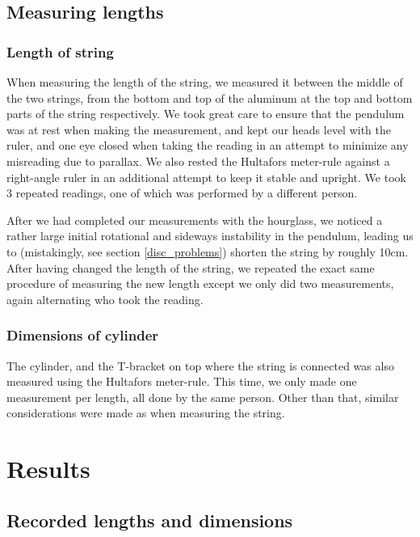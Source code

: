 \documentclass[%
 reprint,
 amsmath,amssymb,
 aps,
]{revtex4-1}
\begin{document}
        \subsection{Measuring lengths}
            \subsubsection{\label{subsubsect:strings}Length of string}
                When measuring the length of the string, we measured it between the middle of the two strings, from the bottom and top of the aluminum at the top and bottom parts of the string respectively. We took great care to ensure that the pendulum was at rest when making the measurement, and kept our heads level with the ruler, and one eye closed when taking the reading in an attempt to minimize any misreading due to parallax. We also rested the Hultafors meter-rule against a right-angle ruler in an additional attempt to keep it stable and upright. We took 3 repeated readings, one of which was performed by a different person. 

                After we had completed our measurements with the hourglass, we noticed a rather large initial rotational and sideways instability in the pendulum, leading us to (mistakingly, see section \ref{disc_problems}) shorten the string by roughly 10cm. After having changed the length of the string, we repeated the exact same procedure of measuring the new length except we only did two measurements, again alternating who took the reading.

            \subsubsection{\label{subsubsect:dim_cyllinder}Dimensions of cylinder}
                The cylinder, and the T-bracket on top where the string is connected was also measured using the Hultafors meter-rule. This time, we only made one measurement per length, all done by the same person. Other than that, similar considerations were made as when measuring the string.





\section{\label{sect:results}Results}
   
    \subsection{\label{subsect:len_dim}Recorded lengths and dimensions}
\end{document}
